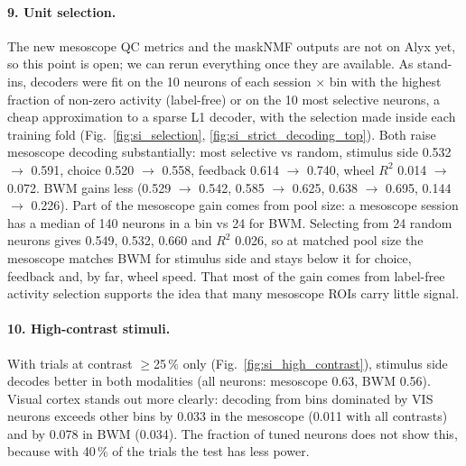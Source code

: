 \documentclass[10pt]{article}
\begin{document}
\paragraph{9. Unit selection.}
The new mesoscope QC metrics and the maskNMF outputs are not on Alyx yet, so this point is open; we can rerun everything once they are available. As stand-ins, decoders were fit on the 10 neurons of each session $\times$ bin with the highest fraction of non-zero activity (label-free) or on the 10 most selective neurons, a cheap approximation to a sparse L1 decoder, with the selection made inside each training fold (Fig.~\ref{fig:si_selection}, \ref{fig:si_strict_decoding_top}). Both raise mesoscope decoding substantially: most selective vs random, stimulus side 0.532 $\to$ 0.591, choice 0.520 $\to$ 0.558, feedback 0.614 $\to$ 0.740, wheel $R^2$ 0.014 $\to$ 0.072. BWM gains less (0.529 $\to$ 0.542, 0.585 $\to$ 0.625, 0.638 $\to$ 0.695, 0.144 $\to$ 0.226). Part of the mesoscope gain comes from pool size: a mesoscope session has a median of 140 neurons in a bin vs 24 for BWM. Selecting from 24 random neurons gives 0.549, 0.532, 0.660 and $R^2$ 0.026, so at matched pool size the mesoscope matches BWM for stimulus side and stays below it for choice, feedback and, by far, wheel speed. That most of the gain comes from label-free activity selection supports the idea that many mesoscope ROIs carry little signal.

\paragraph{10. High-contrast stimuli.}
With trials at contrast $\geq$25\,\% only (Fig.~\ref{fig:si_high_contrast}), stimulus side decodes better in both modalities (all neurons: mesoscope 0.63, BWM 0.56). Visual cortex stands out more clearly: decoding from bins dominated by VIS neurons exceeds other bins by 0.033 in the mesoscope (0.011 with all contrasts) and by 0.078 in BWM (0.034). The fraction of tuned neurons does not show this, because with 40\,\% of the trials the test has less power.




















\end{document}

